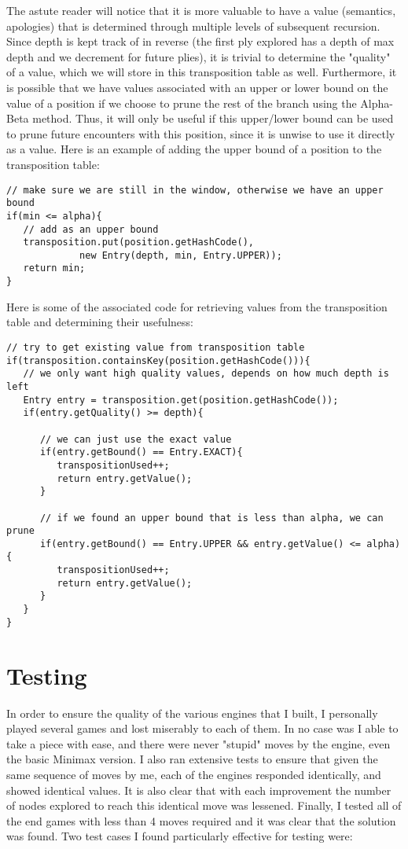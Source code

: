 \documentclass[11pt, oneside]{article}%
\begin{document}
The astute reader will notice that it is more valuable to have a value (semantics, apologies) that is determined through multiple levels of subsequent recursion.  Since depth is kept track of in reverse (the first ply explored has a depth of max depth and we decrement for future plies), it is trivial to determine the "quality" of a value, which we will store in this transposition table as well.  Furthermore, it is possible that we have values associated with an upper or lower bound on the value of a position if we choose to prune the rest of the branch using the Alpha-Beta method.  Thus, it will only be useful if this upper/lower bound can be used to prune future encounters with this position, since it is unwise to use it directly as a value.  Here is an example of adding the upper bound of a position to the transposition table:

\begin{lstlisting}
// make sure we are still in the window, otherwise we have an upper bound
if(min <= alpha){
   // add as an upper bound
   transposition.put(position.getHashCode(),
   		     new Entry(depth, min, Entry.UPPER));
   return min;
}
\end{lstlisting}
\newpage
\noindent Here is some of the associated code for retrieving values from the transposition table and determining their usefulness:

\begin{lstlisting}
// try to get existing value from transposition table
if(transposition.containsKey(position.getHashCode())){
   // we only want high quality values, depends on how much depth is left
   Entry entry = transposition.get(position.getHashCode());
   if(entry.getQuality() >= depth){
      
      // we can just use the exact value
      if(entry.getBound() == Entry.EXACT){
         transpositionUsed++;
         return entry.getValue();
      }
      
      // if we found an upper bound that is less than alpha, we can prune
      if(entry.getBound() == Entry.UPPER && entry.getValue() <= alpha){
         transpositionUsed++;
         return entry.getValue();
      }
   }
}
\end{lstlisting}

\section{Testing}
In order to ensure the quality of the various engines that I built, I personally played several games and lost miserably to each of them.  In no case was I able to take a piece with ease, and there were never "stupid" moves by the engine, even the basic Minimax version.  I also ran extensive tests to ensure that given the same sequence of moves by me, each of the engines responded identically, and showed identical values.  It is also clear that with each improvement the number of nodes explored to reach this identical move was lessened.  Finally, I tested all of the end games with less than 4 moves required and it was clear that the solution was found.  Two test cases I found particularly effective for testing were:
\end{document}
